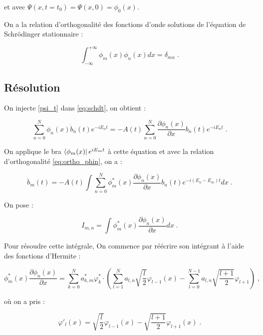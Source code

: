 \documentclass{report}
\begin{document}
et avec $\Psi(x,t=t_{0})= \Psi(x,0) = \phi_{0}(x)$.

On a la relation d'orthogonalité des fonctions d'onde solutions de l'équation de Schrödinger stationnaire :

\begin{equation}\label{eq:ortho_phin}
\int_{-\infty}^{+\infty} \phi_m(x) \phi_n(x) dx = \delta_{mn}\;.
\end{equation}

\subsection{Résolution}

On injecte \eqref{psi_t} dans \eqref{eq:schdt}, on obtient :

\begin{equation}
\sum_{n=0}^{N}\phi_{n}(x)\dot{b}_{n}(t) e^{-iE_{n}t} = - A(t) \sum_{n=0}^{N}\frac{\partial \phi_{n}(x)}{\partial x}b_{n}(t) e^{-iE_{n}t}\;.
\end{equation}

On applique le bra $\bra{\phi_{m}(x)} e^{iE_{m}t}$ à cette équation et avec la relation d'orthogonalité \eqref{eq:ortho_phin}, on a :

\begin{equation}
\dot{b}_{m}(t) = - A(t) \int \sum_{n=0}^{N}\phi_{m}^{\ast}(x)\frac{\partial \phi_{n}(x)}{\partial x}b_{n}(t) e^{-i(E_{n}-E_{m})t} dx\;.
\end{equation}

On pose :

\begin{equation}
I_{m,n}= \int \phi_{m}^{\ast}(x)\frac{\partial \phi_{n}(x)}{\partial x} dx\;.
\end{equation}

Pour résoudre cette intégrale, On commence par réécrire son intégrant à l'aide des fonctions d'Hermite :

\begin{equation}
\phi_{m}^{\ast}(x)\frac{\partial \phi_{n}(x)}{\partial x} = \sum_{k=0}^{N} a_{k,m}^{\ast}\varphi_{k}^{\ast} \cdot \left(\sum_{l=1}^{N}a_{l,n} \sqrt{\frac{l}{2}}\varphi_{l-1}(x)-\sum_{l=0}^{N-1}a_{l,n}\sqrt{\frac{l+1}{2}}\varphi_{l+1} \right)\;,
\end{equation}

où on a pris :

\begin{equation}
\varphi'_{l}(x) =  \sqrt{\frac{l}{2}} \varphi_{l-1}(x)-\sqrt{\frac{l+1}{2}}\varphi_{l+1}(x)\;.
\end{equation}
\end{document}
